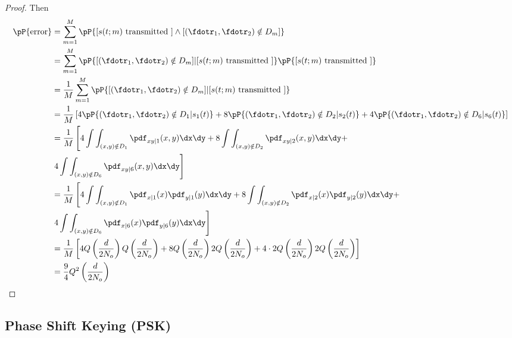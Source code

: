 {\begin{proof}
Then
\begin{align*}
   \pP{\mbox{error}}
     &= \sum_{m=1}^M \pP{[s(t;m)\mbox{ transmitted }]\land
                            [(\fdotr_1,\fdotr_2)\notin D_m] }
   \\&= \sum_{m=1}^M \pP{[(\fdotr_1,\fdotr_2)\notin D_m]|
                            [s(t;m)\mbox{ transmitted }] }
                      \pP{[s(t;m)\mbox{ transmitted }]}
   \\&= \frac{1}{M}
         \sum_{m=1}^M \pP{[(\fdotr_1,\fdotr_2)\notin D_m]|
                            [s(t;m)\mbox{ transmitted }] }
   \\&= \frac{1}{M}\left[
         4 \pP{(\fdotr_1,\fdotr_2)\notin D_1 | s_1(t)} +
         8 \pP{(\fdotr_1,\fdotr_2)\notin D_2 | s_2(t)} +
         4 \pP{(\fdotr_1,\fdotr_2)\notin D_6 | s_6(t)}
         \right]
   \\&= \frac{1}{M}\left[
         4 \int\int_{(x,y)\notin D_1} \pdf_{xy|1}(x,y)\dx\dy +
         8 \int\int_{(x,y)\notin D_2} \pdf_{xy|2}(x,y)\dx\dy + \right.
         \\& \left.4 \int\int_{(x,y)\notin D_6} \pdf_{xy|6}(x,y)\dx\dy
         \right]
   \\&= \frac{1}{M}\left[
         4 \int\int_{(x,y)\notin D_1} \pdf_{x|1}(x) \pdf_{y|1}(y)\dx\dy +
         8 \int\int_{(x,y)\notin D_2} \pdf_{x|2}(x) \pdf_{y|2}(y)\dx\dy + \right.
         \\& \left.4 \int\int_{(x,y)\notin D_6} \pdf_{x|6}(x) \pdf_{y|6}(y)\dx\dy
         \right]
   \\&= \frac{1}{M} \left[
         4 Q\left(\frac{d}{2N_o}\right) Q\left(\frac{d}{2N_o}\right) +
         8 Q\left(\frac{d}{2N_o}\right) 2Q\left(\frac{d}{2N_o}\right) +
         4\cdot2 Q\left(\frac{d}{2N_o}\right) 2Q\left(\frac{d}{2N_o}\right)
         \right]
   \\&= \frac{9}{4} Q^2\left(\frac{d}{2N_o}\right)
\end{align*}
\end{proof}






\subsection{Phase Shift Keying (PSK)}



}
